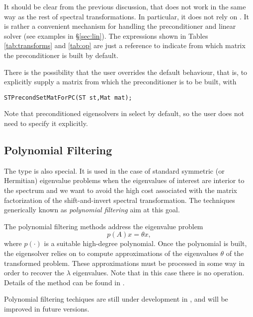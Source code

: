 	It should be clear from the previous discussion, that  does not work in the same way as the rest of spectral transformations. In particular, it does not rely on . It is rather a convenient mechanism for handling the preconditioner and linear solver (see examples in \S\ref{sec:lin}). The expressions shown in Tables \ref{tab:transforms} and \ref{tab:op} are just a reference to indicate from which matrix the preconditioner is built by default.

	There is the possibility that the user overrides the default behaviour, that is, to explicitly supply a matrix from which the preconditioner is to be built, with
	\begin{Verbatim}[fontsize=\small]
	STPrecondSetMatForPC(ST st,Mat mat);
	\end{Verbatim}

	Note that preconditioned eigensolvers in  select  by default, so the user does not need to specify it explicitly.

\subsection{Polynomial Filtering}
\label{sec:filter}

The type  is also special. It is used in the case of standard symmetric (or Hermitian) eigenvalue problems when the eigenvalues of interest are interior to the spectrum and we want to avoid the high cost associated with the matrix factorization of the shift-and-invert spectral transformation. The techniques generically known as \emph{polynomial filtering} aim at this goal.

The polynomial filtering methods address the eigenvalue problem
\begin{equation}
\label{eq:polyfilt}
p(A)x=\theta x,
\end{equation}
where $p(\cdot)$ is a suitable high-degree polynomial. Once the polynomial is built, the eigensolver relies on  to compute approximations of the eigenvalues $\theta$ of the transformed problem. These approximations must be processed in some way in order to recover the $\lambda$ eigenvalues. Note that in this case there is no  operation. Details of the method can be found in \citep{Fang:2012:FLP}.

Polynomial filtering techiques are still under development in \slepc, and will be improved in future versions.


